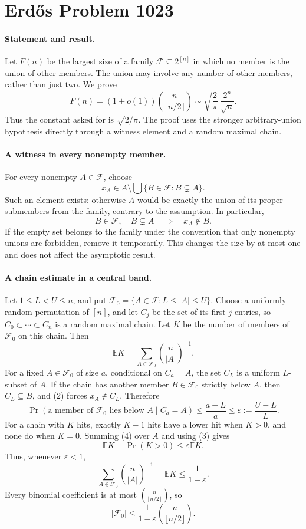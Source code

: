 \section*{Erd\H{o}s Problem 1023}

\paragraph{Statement and result.}
Let \(F(n)\) be the largest size of a family \(\mathcal F\subseteq2^{[n]}\) in which no member is the union of other members. The union may involve any number of other members, rather than just two. We prove
\[
 F(n)=(1+o(1))\binom n{\lfloor n/2\rfloor}
 \sim\sqrt{\frac2\pi}\,\frac{2^n}{\sqrt n}.
\]
Thus the constant asked for is \(\sqrt{2/\pi}\). The proof uses the stronger arbitrary-union hypothesis directly through a witness element and a random maximal chain.

\paragraph{A witness in every nonempty member.}
For every nonempty \(A\in\mathcal F\), choose
\[
 x_A\in A\setminus\bigcup\{B\in\mathcal F:B\subsetneq A\}. \tag{1}
\]
Such an element exists: otherwise \(A\) would be exactly the union of its proper submembers from the family, contrary to the assumption. In particular,
\[
 B\in\mathcal F,\quad B\subsetneq A
 \quad\Longrightarrow\quad x_A\notin B. \tag{2}
\]
If the empty set belongs to the family under the convention that only nonempty unions are forbidden, remove it temporarily. This changes the size by at most one and does not affect the asymptotic result.

\paragraph{A chain estimate in a central band.}
Let \(1\leq L<U\leq n\), and put
\(\mathcal F_0=\{A\in\mathcal F:L\leq|A|\leq U\}\).
Choose a uniformly random permutation of \([n]\), and let \(C_j\) be the set of its first \(j\) entries, so \(C_0\subset\cdots\subset C_n\) is a random maximal chain. Let \(K\) be the number of members of \(\mathcal F_0\) on this chain. Then
\[
 \mathbb E K=\sum_{A\in\mathcal F_0}\binom n{|A|}^{-1}. \tag{3}
\]
For a fixed \(A\in\mathcal F_0\) of size \(a\), conditional on \(C_a=A\), the set \(C_L\) is a uniform \(L\)-subset of \(A\). If the chain has another member \(B\in\mathcal F_0\) strictly below \(A\), then \(C_L\subseteq B\), and (2) forces \(x_A\notin C_L\). Therefore
\[
 \Pr(\text{a member of }\mathcal F_0\text{ lies below }A\mid C_a=A)
 \leq\frac{a-L}{a}\leq\varepsilon:=\frac{U-L}{L}. \tag{4}
\]
For a chain with \(K\) hits, exactly \(K-1\) hits have a lower hit when \(K>0\), and none do when \(K=0\). Summing (4) over \(A\) and using (3) gives
\[
 \mathbb E K-\Pr(K>0)\leq\varepsilon\mathbb E K.
\]
Thus, whenever \(\varepsilon<1\),
\[
 \sum_{A\in\mathcal F_0}\binom n{|A|}^{-1}
 =\mathbb E K\leq\frac1{1-\varepsilon}. \tag{5}
\]
Every binomial coefficient is at most \(\binom n{\lfloor n/2\rfloor}\), so
\[
 |\mathcal F_0|\leq\frac1{1-\varepsilon}
                       \binom n{\lfloor n/2\rfloor}. \tag{6}
\]

